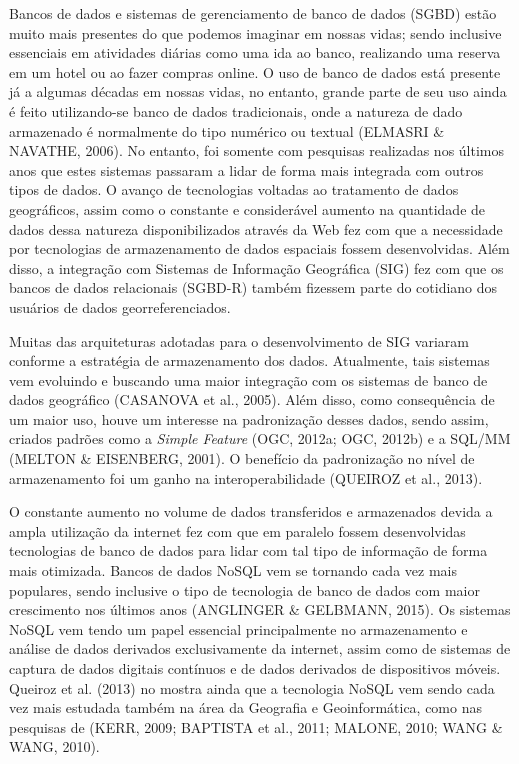 		Bancos de dados e sistemas de gerenciamento de banco de dados (SGBD) estão muito mais presentes do que podemos imaginar em nossas vidas; sendo inclusive essenciais em atividades diárias como uma ida ao banco, realizando uma reserva em um hotel ou ao fazer compras online. O uso de banco de dados está presente já a algumas décadas em nossas vidas, no entanto, grande parte de seu uso ainda é feito utilizando-se banco de dados tradicionais, onde a natureza de dado armazenado é normalmente do tipo numérico ou textual (ELMASRI \& NAVATHE, 2006)\cite{ELMASRI_NAVATHE}. No entanto, foi somente com pesquisas realizadas nos últimos anos que estes sistemas passaram a lidar de forma mais integrada com outros tipos de dados. O avanço de tecnologias voltadas ao tratamento de dados geográficos, assim como o constante e considerável aumento na quantidade de dados dessa natureza disponibilizados através da Web fez com que a necessidade por tecnologias de armazenamento de dados espaciais fossem desenvolvidas. Além disso, a integração com Sistemas de Informação Geográfica (SIG) fez com que os bancos de dados relacionais (SGBD-R) também fizessem parte do cotidiano dos usuários de dados georreferenciados.
		
		Muitas das arquiteturas adotadas para o desenvolvimento de SIG variaram conforme a estratégia de armazenamento dos dados. Atualmente, tais sistemas vem evoluindo e buscando uma maior integração com os sistemas de banco de dados geográfico (CASANOVA et al., 2005). Além disso, como consequência de um maior uso, houve um interesse na padronização desses dados, sendo assim, criados padrões como a \textit{Simple Feature} (OGC, 2012a\cite{OGC_12a}; OGC, 2012b\cite{OGC_12b}) e a SQL/MM (MELTON \& EISENBERG, 2001)\cite{MELTON_EISENBERG}. O benefício da padronização no nível de armazenamento foi um ganho na interoperabilidade (QUEIROZ et al., 2013)\cite{QUEIROZ_etal13}.
		
		O constante aumento no volume de dados transferidos e armazenados devida a ampla utilização da internet fez com que em paralelo fossem desenvolvidas tecnologias de banco de dados para lidar com tal tipo de informação de forma mais otimizada. Bancos de dados NoSQL vem se tornando cada vez mais populares, sendo inclusive o tipo de tecnologia de banco de dados com maior crescimento nos últimos anos (ANGLINGER \& GELBMANN, 2015)\cite{ANGLINGER_GELBMANN}. Os sistemas NoSQL vem tendo um papel essencial principalmente no armazenamento e análise de dados derivados exclusivamente da internet, assim como de sistemas de captura de dados digitais contínuos e de dados derivados de dispositivos móveis. Queiroz et al. (2013)\cite{QUEIROZ_etal13} no mostra ainda que a tecnologia NoSQL vem sendo cada vez mais estudada também na área da Geografia e  Geoinformática, como nas pesquisas de (KERR, 2009\cite{KERR}; BAPTISTA et al., 2011\cite{BAPTISTA_etal11}; MALONE, 2010\cite{MALONE}; WANG \& WANG, 2010)\cite{WANG_WANG}.
		
